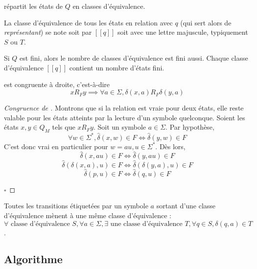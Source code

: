 \begin{corollary}
 \rf répartit les états de $Q$ en classes d'équivalence.
\end{corollary}

La classe d'équivalence de tous les états en relation \rf avec $q$ (qui sert alors de \emph{représentant}) se note soit par $[[q]]$ soit avec une lettre majuscule, typiquement $S$ ou $T$.

\begin{corollary}\label{col:qclasses}
  Si $Q$ est fini, alors le nombre de classes d'équivalence est fini aussi. Chaque classe d'équivalence $[[q]]$ contient un nombre d'états fini.
\end{corollary}

\begin{proposition}[Congruence de \rf]
 \rf est congruente à droite, c'est-à-dire $$xR_Fy \implies \forall a \in \Sigma, \delta(x,a)R_F\delta(y,a)$$
\end{proposition}

\begin{proof}[Congruence de \rf]\label{proof:rmcongruency}
 Montrons que si la relation est vraie pour deux états, elle reste valable pour les états atteints par la lecture d'un symbole quelconque. Soient les états $x,y \in Q_M$ tels que $xR_Fy$. Soit un symbole $a \in \Sigma$. Par hypothèse,
 $$\forall w \in \Sigma^*, \hat{\delta}(x, w) \in F \iff \hat{\delta}(y, w) \in F$$
 C'est donc vrai en particulier pour $w = au, u \in \Sigma^*$. Dès lors,
 $$\hat{\delta}(x, au) \in F\iff \hat{\delta}(y, au)\in F$$
 $$\hat{\delta}(\delta(x,a),u) \in F\iff\hat{\delta}(\delta(y,a),u)\in F$$
 $$\hat{\delta}(p,u) \in F\iff \hat{\delta}(q,u)\in F$$

\hfill$\square$
\end{proof}

\begin{corollary}\label{col:st}
 Toutes les transitions étiquetées par un symbole $a$ sortant d'une classe d'équivalence mènent à une même classe d'équivalence :
 $\forall\text{ classe d'équivalence }S,\forall a \in \Sigma, \exists\text{ une classe d'équivalence } T, \forall q \in S, \delta(q,a)\in T$.
\end{corollary}



\subsection{Algorithme}\label{tfa:tfa}

